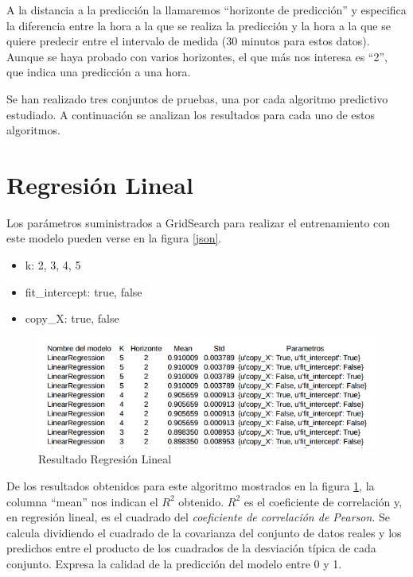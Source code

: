 A la distancia a la predicción la llamaremos ``horizonte de predicción'' y especifica la diferencia entre la hora a la que se realiza la predicción y la hora a la que se quiere predecir entre el intervalo de medida (30 minutos para estos datos). Aunque se haya probado con varios horizontes, el que más nos interesa es ``2'', que indica una predicción a una hora.

Se han realizado tres conjuntos de pruebas, una por cada algoritmo predictivo estudiado. A continuación se analizan los resultados para cada uno de estos algoritmos.

\section{Regresión Lineal}
\label{makereference7.1}
Los parámetros suministrados a GridSearch para realizar el entrenamiento con este modelo pueden verse en la figura \ref{json}.

\begin{itemize}
\item k: 2, 3, 4, 5
\item fit\_intercept: true, false
\item copy\_X: true, false 
\end{itemize}

\begin{figure}[htb]
	\begin{center}
		\includegraphics[width=14cm]{figures/resultado_linear.png}
		\caption{Resultado Regresión Lineal \label{resultado_linear}}
	\end{center}
\end{figure}

De los resultados obtenidos para este algoritmo mostrados en la figura \ref{resultado_linear}, la columna ``mean'' nos indican el \(R^{2}\) obtenido. \(R^{2}\) es el coeficiente de correlación y, en regresión lineal, es el cuadrado del \textit{coeficiente de correlación de Pearson}. Se calcula dividiendo el cuadrado de la covarianza del conjunto de datos reales y los predichos entre el producto de los cuadrados de la desviación típica de cada conjunto. Expresa la calidad de la predicción del modelo entre 0 y 1.

